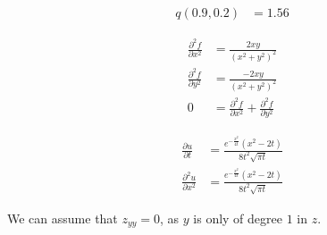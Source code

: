 \documentclass[8pt]{extarticle}
\begin{document}
\begin{problem}{14.7}
\begin{description}[font=\normalfont]
\begin{align*}
          q(0.9,0.2) &= 1.56
        \end{align*}
      \item[48:]
        \begin{align*}
          \frac{\partial^2f}{\partial x^2} &= \frac{2xy}{(x^2 + y^2)^2}\\
          \frac{\partial^2 f}{\partial y^2} &= \frac{-2xy}{(x^2 + y^2)^2}\\
          0 &= \frac{\partial^2 f}{\partial x^2} + \frac{\partial^2 f}{\partial y^2}
        \end{align*}
      \item[50 (a):]
        \begin{align*}
          \frac{\partial u}{\partial t} &= \frac{e^{-\frac{x^2}{4t}}(x^2 - 2t)}{8t^2\sqrt{\pi t}}\\
          \frac{\partial^2 u}{\partial x^2} &= \frac{e^{-\frac{x^2}{4t}}(x^2 - 2t)}{8t^2\sqrt{\pi t}}
        \end{align*}
      \item[52:] We can assume that $z_{yy} = 0$, as $y$ is only of degree $1$ in $z$.
    \end{description}
  \end{problem}
\end{document}
